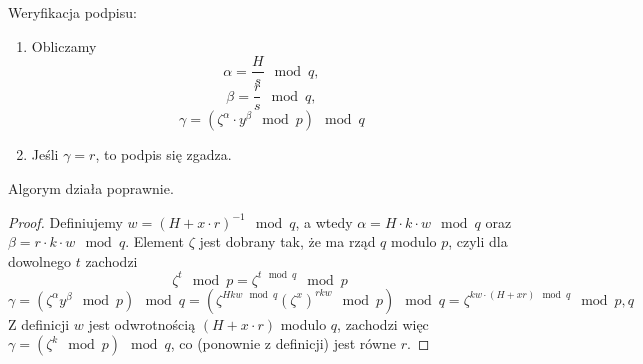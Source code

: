 \begin{greyframe}
	Weryfikacja podpisu:
	\begin{enumerate}
		\item Obliczamy
		      \[
			      \alpha = \frac{H}{s} \mod q,
		      \]
		      \[
			      \beta = \frac{r}{s} \mod q,
		      \]
		      \[
			      \gamma = (\zeta^{\alpha} \cdot y^{\beta} \mod p) \mod q
		      \]
		\item Jeśli \( \gamma = r \), to podpis się zgadza.
	\end{enumerate}
\end{greyframe}

Algorym działa poprawnie.
\begin{proof}
	Definiujemy \( w = (H + x \cdot r)^{-1} \mod q \), a wtedy \( \alpha = H \cdot k \cdot w \mod q \) oraz \( \beta = r \cdot k \cdot w \mod q \).
	Element \( \zeta \) jest dobrany tak, że ma rząd \( q \) modulo \( p \), czyli dla dowolnego \( t \) zachodzi
	\[
		\zeta^t \mod p = \zeta^{t \!\!\mod q} \mod p
	\]
	\[
		\gamma = (\zeta^{\alpha} y^{\beta} \!\!\mod p) \!\!\mod q = (\zeta^{H k w \!\!\!\mod q} (\zeta^{x})^{r k w} \!\!\mod p) \!\!\mod q  = \zeta^{k w \cdot (H + x r) \!\!\!\mod q} \!\!\mod p, q
	\]
	Z definicji \( w \) jest odwrotnością \( (H + x \cdot r) \) modulo \( q \), zachodzi więc \( \gamma = (\zeta^k \mod p) \mod q \), co (ponownie z definicji) jest równe \( r \).
\end{proof}